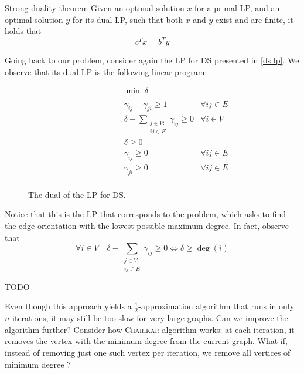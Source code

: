\documentclass[a4paper, 12pt]{report}
\begin{document}
    \begin{framedthm}{Strong duality theorem}
        Given an optimal solution $x$ for a primal LP, and an optimal solution $y$ for its dual LP, such that both $x$ and $y$ exist and are finite, it holds that $$c^Tx = b^Ty$$
    \end{framedthm}

    Going back to our problem, consider again the LP for DS presented in \cref{ds lp}. We observe that its dual LP is the following linear program:

    \begin{figure}[H]
        \centering
        \[\begin{array}{ccl}
            \qquad\qquad\quad
            & \min \; \delta \\\\
            & \gamma_{ij} + \gamma_{ji} \ge 1 & \forall i j \in E \\
            & \delta - \sum\limits_{\substack{j \in V : \\ ij \in E}}{\gamma_{ij}} \ge 0 & \forall i \in V \\
            & \delta \ge 0 \\
            & \gamma_{ij} \ge 0 & \forall i j \in E \\
            & \gamma_{ji} \ge 0 & \forall i j \in E \\
        \end{array}\]
        \caption{The dual of the LP for DS.}
    \end{figure}
    
    Notice that this is the LP that corresponds to the  problem, which asks to find the edge orientation with the lowest possible maximum degree. In fact, observe that $$\forall i \in V \quad \delta - \sum_{\substack{j \in V : \\ ij \in E}}{\gamma_{ij}} \ge 0 \iff \delta \ge \deg(i)$$

    TODO 

    Even though this approach yields a $\tfrac{1}{2}$-approximation algorithm that runs in only $n$ iterations, it may still be too slow for very large graphs. Can we improve the algorithm further? Consider how \textsc{Charikar} algorithm works: at each iteration, it removes the vertex with the minimum degree from the current graph. What if, instead of removing just one such vertex per iteration, we remove all vertices of minimum degree ?
\end{document}
